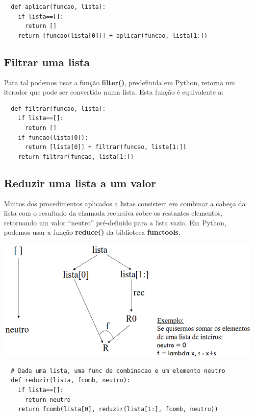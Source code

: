 \documentclass{article}
\begin{document}
\begin{lstlisting}
  def aplicar(funcao, lista):
    if lista==[]:
      return []
    return [funcao(lista[0])] + aplicar(funcao, lista[1:])
\end{lstlisting}

\subsection{Filtrar uma lista}

Para tal podemos usar a função \textbf{filter()}, predefinida em Python,
retorna um iterador que pode ser convertido numa lista. Esta função é
equivalente a:

\begin{lstlisting}
  def filtrar(funcao, lista):
    if lista==[]:
      return []
    if funcao(lista[0]):
      return [lista[0]] + filtrar(funcao, lista[1:])
    return filtrar(funcao, lista[1:])
\end{lstlisting}

\subsection{Reduzir uma lista a um valor}

Muitos dos procedimentos aplicados a listas consistem em combinar a cabeça da lista com o
resultado da chamada recursiva sobre os restantes elementos, retornando um valor “neutro”
pré-definido para a lista vazia. Em Python, podemos usar a função \textbf{reduce()} da
biblioteca \textbf{functools}.

\begin{center}
  \includegraphics[scale=0.3]{5}
\end{center}

\begin{lstlisting}
  # Dada uma lista, uma func de combinacao e um elemento neutro
  def reduzir(lista, fcomb, neutro):
    if lista==[]:
      return neutro
    return fcomb(lista[0], reduzir(lista[1:], fcomb, neutro))
\end{lstlisting}
\end{document}
